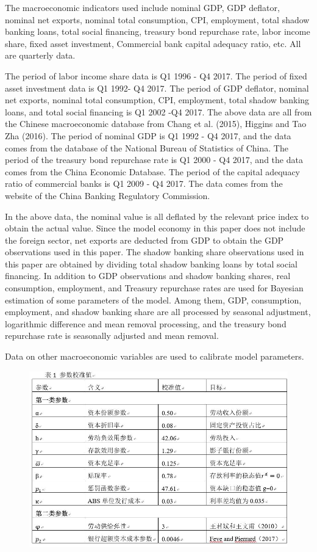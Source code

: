 \documentclass[10pt,math=newtx,citestyle=gb7714-2015,bibstyle=gb7714-2015]{elegantbook}
\begin{document}
	The macroeconomic indicators used include nominal GDP, GDP deflator, nominal net exports, nominal total consumption, CPI, employment, total shadow banking loans, total social financing, treasury bond repurchase rate, labor income share, fixed asset investment, Commercial bank capital adequacy ratio, etc. All are quarterly data.
	
	The period of labor income share data is Q1 1996 - Q4 2017. The period of fixed asset investment data is Q1 1992- Q4 2017. The period of GDP deflator, nominal net exports, nominal total consumption, CPI, employment, total shadow banking loans, and total social financing is Q1 2002 -Q4 2017. The above data are all from the Chinese macroeconomic database from Chang et al. (2015), Higgins and Tao Zha (2016). The period of nominal GDP is Q1 1992 - Q4 2017, and the data comes from the database of the National Bureau of Statistics of China. The period of the treasury bond repurchase rate is Q1 2000 - Q4 2017, and the data comes from the China Economic Database. The period of the capital adequacy ratio of commercial banks is Q1 2009 - Q4 2017. The data comes from the website of the China Banking Regulatory Commission.
	
	In the above data, the nominal value is all deflated by the relevant price index to obtain the actual value. Since the model economy in this paper does not include the foreign sector, net exports are deducted from GDP to obtain the GDP observations used in this paper. The shadow banking share observations used in this paper are obtained by dividing total shadow banking loans by total social financing. In addition to GDP observations and shadow banking shares, real consumption, employment, and Treasury repurchase rates are used for Bayesian estimation of some parameters of the model. Among them, GDP, consumption, employment, and shadow banking share are all processed by seasonal adjustment, logarithmic difference and mean removal processing, and the treasury bond repurchase rate is seasonally adjusted and mean removal.
	
	Data on other macroeconomic variables are used to calibrate model parameters.

	
	\begin{figure}[htbp!]
		\centering
		\includegraphics[width=0.8\linewidth]{FIG/table1}
		\centering
	\end{figure}
	
\end{document}

